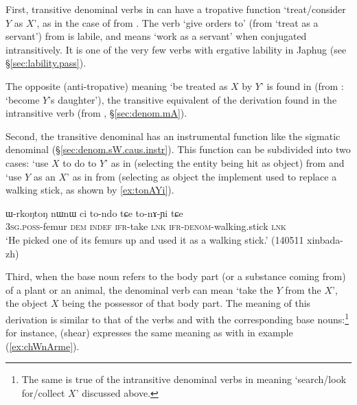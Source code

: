 First, transitive denominal verbs in  can have a tropative function `treat/consider $Y$ as $X$', as in the case of  from . The verb  `give orders to' (from `treat as a servant') from  is labile, and means `work as a servant' when conjugated intransitively. It is one of the very few verbs with ergative lability in Japhug (see §\ref{sec:lability.pass}).


The opposite (anti-tropative) meaning `be treated as $X$ by $Y$' is found in   (from : `become $Y$'s daughter'), the transitive equivalent of the  derivation found in the intransitive verb  (from  , §\ref{sec:denom.mA}). 



Second, the transitive  denominal has an instrumental function like the sigmatic denominal (§\ref{sec:denom.sW.caus.instr}). This function can be subdivided into two cases: `use $X$ to do to $Y$' as in   (selecting the entity being hit as object) from  and `use $Y$ as an $X$' as in   from  (selecting as object the implement used to replace a walking stick, as shown by \ref{ex:tonAYi}).

\begin{exe}
\ex \label{ex:tonAYi}
\gll  ɯ-rkoŋtoŋ nɯnɯ ci to-ndo tɕe to-nɤ-ɲi tɕe \\
\textsc{3sg}.\textsc{poss}-femur \textsc{dem} \textsc{indef} \textsc{ifr}-take \textsc{lnk} \textsc{ifr}-\textsc{denom}-walking.stick \textsc{lnk} \\
\glt `He picked one of its femurs up and used it as a walking stick.' (140511 xinbada-zh) 
\end{exe}

Third, when the base noun refers to the body part (or a substance coming from) of a plant or an animal, the denominal verb can mean `take the $Y$ from the $X$', the object $X$ being the possessor of that body part. The meaning of this derivation is similar to that of the verbs  and  with the corresponding base nouns:\footnote{The same is true of the intransitive denominal verbs in  meaning `search/look for/collect $X$' discussed above.}  for instance,  (shear) expresses the same meaning as  with  in example  (\ref{ex:chWnArme}).

